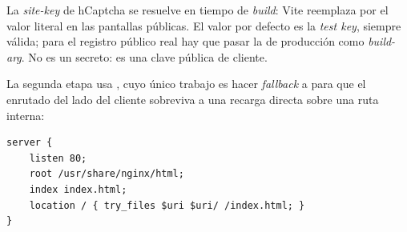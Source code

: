 La \emph{site-key} de hCaptcha se resuelve en tiempo de \emph{build}: Vite reemplaza \allowbreak {}\allowbreak {}\allowbreak {}\allowbreak {}\allowbreak {}\allowbreak {} por el valor literal en las pantallas públicas. El valor por defecto es la \emph{test key}, siempre válida; para el registro público real hay que pasar la de producción como \emph{build-arg}. No es un secreto: es una clave pública de cliente.

La segunda etapa usa , cuyo único trabajo es hacer \emph{fallback} a  para que el enrutado del lado del cliente sobreviva a una recarga directa sobre una ruta interna:

\begin{lstlisting}[numbers=none]
server {
    listen 80;
    root /usr/share/nginx/html;
    index index.html;
    location / { try_files $uri $uri/ /index.html; }
}
\end{lstlisting}
